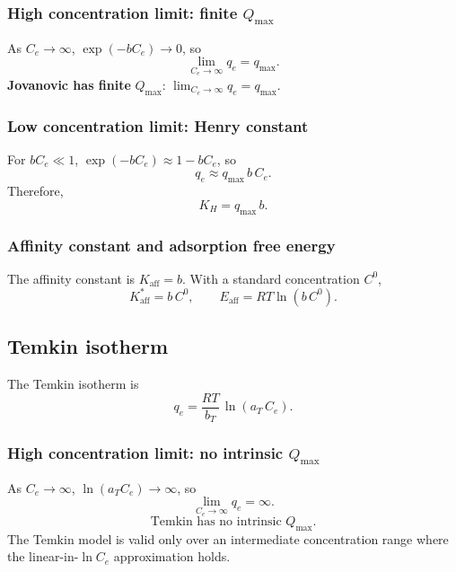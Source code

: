 \documentclass[journal=aamick,manuscript=article]{achemso}
\begin{document}
\subsubsection{High concentration limit: finite $Q_{\max}$}

As $C_e \to \infty$, $\exp(-bC_e) \to 0$, so
\begin{equation}
	\lim_{C_e \to \infty} q_e = q_{\max}.
\end{equation}
\textbf{Jovanovic has finite }$Q_{\max}$:\quad
$\displaystyle \lim_{C_e \to \infty} q_e = q_{\max}$.

\subsubsection{Low concentration limit: Henry constant}

For $bC_e \ll 1$, $\exp(-bC_e) \approx 1 - bC_e$, so
\begin{equation}
	q_e \approx q_{\max}\, b\, C_e.
\end{equation}
Therefore,
\begin{equation}
	\boxed{K_H = q_{\max}\, b.}
\end{equation}

\subsubsection{Affinity constant and adsorption free energy}

The affinity constant is $K_{\mathrm{aff}} = b$. With a standard concentration $C^0$,
\begin{equation}
	\boxed{
		K_{\mathrm{aff}}^{\ast} = b\, C^0,
		\qquad
		E_{\mathrm{aff}} = RT\ln(b\, C^0).
	}
\end{equation}

\subsection{Temkin isotherm}
\label{sec:si_temkin}

The Temkin isotherm is
\begin{equation}
	q_e = \frac{RT}{b_T}\,\ln(a_T\, C_e).
	\label{eq:si_temkin}
\end{equation}

\subsubsection{High concentration limit: no intrinsic $Q_{\max}$}

As $C_e \to \infty$, $\ln(a_T C_e) \to \infty$, so
\begin{equation}
	\lim_{C_e \to \infty} q_e = \infty.
\end{equation}
\begin{equation}
	\boxed{\text{Temkin has no intrinsic } Q_{\max}.}
\end{equation}
The Temkin model is valid only over an intermediate concentration range where the linear-in-$\ln C_e$ approximation holds.
\end{document}
